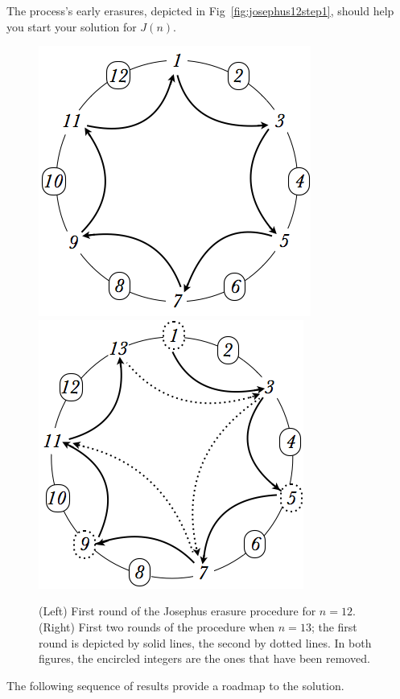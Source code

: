 \begin{itemize}
The process's early erasures, depicted in Fig~\ref{fig:josephus12step1}, should help you start your solution for $J(n)$.
\begin{figure}[ht]
\begin{center}
        \includegraphics[scale=0.35]{FiguresMaths/josephus12step1}
        \hspace*{.2in}
        \includegraphics[scale=0.35]{FiguresMaths/josephus13}
\caption{(Left) First round of the Josephus erasure procedure for $n=12$.
(Right) First two rounds of the procedure when $n=13$; the first round is depicted by solid lines, the second by dotted lines. In both figures, the encircled integers are the ones that have been removed.}
        \label{fig:josephus12step1}  \label{fig:josephus13}
\end{center}
\end{figure}

The following sequence of results provide a roadmap to the solution.


\end{itemize}
